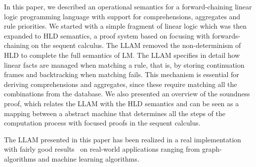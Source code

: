 In this paper, we described an operational semantics for a forward-chaining
linear logic programming language with support for comprehensions, aggregates
and rule priorities. We started with a simple fragment of linear logic which was
then expanded to HLD semantics, a proof system based on focusing with
forwards-chaining on the sequent calculus. The LLAM removed the non-determinism
of HLD to complete the full semantics of LM. The LLAM specifies in detail how
linear facts are managed when matching a rule, that is, by storing continuation
frames and backtracking when matching fails. This mechanism is essential for
deriving comprehensions and aggregates, since these require matching all the
combinations from the database. We also presented an overview of the soundness
proof, which relates the LLAM with the HLD semantics and can be seen as a
mapping between a abstract machine that determines all the steps of the
computation process with focused proofs in the sequent calculus.

The LLAM presented in this paper has been realized in a real
implementation with fairly good results~\cite{cruz-ppdp14,cruz-padl15} on
real-world applications ranging from graph-algorithms and machine learning
algorithms.
